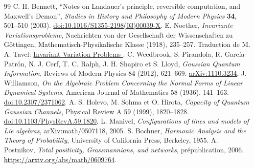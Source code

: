\begin{thebibliography}{99}
 C. H. Bennett, ``Notes on Landauer's principle, reversible computation, and Maxwell's Demon'', \emph{Studies in History and Philosophy of Modern Physics} \textbf{34}, 501--510 (2003). \href{https://doi.org/10.1016/S1355-2198(03)00039-X}{doi:10.1016/S1355-2198(03)00039-X}.
 E. Noether, \emph{Invariante Variationsprobleme}, Nachrichten von der Gesellschaft der Wissenschaften zu Göttingen, Mathematisch-Physikalische Klasse (1918), 235--257. Traduction de M. A. Tavel: \href{https://arxiv.org/abs/physics/0503066}{Invariant Variation Problems
}.
 C. Weedbrook, S. Pirandola, R. García-Patrón, N. J. Cerf, T. C. Ralph, J. H. Shapiro et S. Lloyd, \emph{Gaussian Quantum Information}, Reviews of Modern Physics 84 (2012), 621--669. \href{https://arxiv.org/abs/1110.3234}{arXiv:1110.3234}.
 J. Williamson, \emph{On the Algebraic Problem Concerning the Normal Forms of Linear Dynamical Systems}, American Journal of Mathematics 58 (1936), 141--163. \href{https://doi.org/10.2307/2371062}{doi:10.2307/2371062}.
 A. S. Holevo, M. Sohma et O. Hirota, \emph{Capacity of Quantum Gaussian Channels}, Physical Review A 59 (1999), 1820--1828. \href{https://doi.org/10.1103/PhysRevA.59.1820}{doi:10.1103/PhysRevA.59.1820}.
 L. Manivel, \emph{Configurations of lines and models of Lie algebras}, arXiv:math/0507118, 2005.
 S. Bochner, \emph{Harmonic Analysis and the Theory of Probability}, University of California Press, Berkeley, 1955.
 A. Postnikov, \emph{Total positivity, Grassmannians, and networks},
prépublication, 2006. \url{https://arxiv.org/abs/math/0609764}.
\end{thebibliography}
\endgroup
